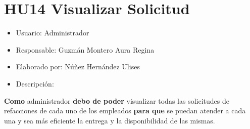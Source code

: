 \section{HU14 Visualizar Solicitud}
\begin{itemize}
	\item Usuario: Administrador
	\item Responsable: Guzmán Montero Aura Regina
	\item Elaborado por: Núñez Hernández Ulises
	\item Descripción:\\
\end{itemize}

\textbf{Como} administrador \textbf{debo de poder} visualizar todas las solicitudes de refacciones de cada uno de los empleados \textbf{para que} se puedan atender a cada una y sea más eficiente la entrega y la disponibilidad de las mismas.